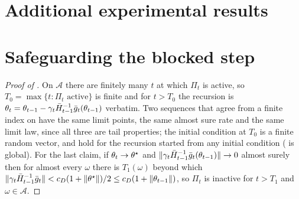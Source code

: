 \section{Additional experimental results}
\label{app:moreexp}






\section{Safeguarding the blocked step}
\label{app:shift}

\begin{proof}[Proof of ]
On $\mathcal A$ there are finitely many $t$ at which $\Pi_t$ is active, so
$T_0=\max\{t:\Pi_t\text{ active}\}$ is finite and for $t>T_0$ the recursion is
$\theta_t=\theta_{t-1}-\gamma_t\bar{H}_{t-1}^{-1}\bar{g}_t(\theta_{t-1})$ verbatim. Two sequences that
agree from a finite index on have the same limit points, the same almost sure rate and the same
limit law, since all three are tail properties; the initial condition at $T_0$ is a finite random
vector, and  hold for the recursion started from any initial
condition ( is global). For the last claim, if $\theta_t\to\theta^\star$ and
$\lVert \gamma_t\bar{H}_{t-1}^{-1}\bar{g}_t(\theta_{t-1}) \rVert\to0$ almost surely then for almost every
$\omega$ there is $T_1(\omega)$ beyond which
$\lVert \gamma_t\bar{H}_{t-1}^{-1}\bar{g}_t \rVert<c_D(1+\lVert \theta^\star \rVert)/2\le c_D(1+\lVert \theta_{t-1} \rVert)$, so
$\Pi_t$ is inactive for $t>T_1$ and $\omega\in\mathcal A$.
\end{proof}

